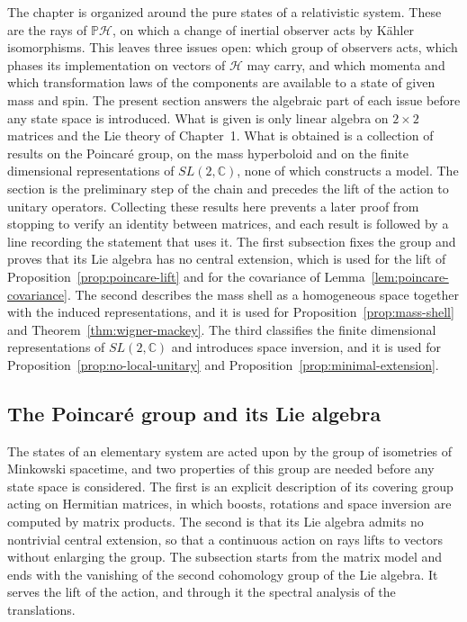The chapter is organized around the pure states of a relativistic system. These are the rays of $\mathbb{P}\mathcal{H}$, on which a change of inertial observer acts by Kähler isomorphisms. This leaves three issues open: which group of observers acts, which phases its implementation on vectors of $\mathcal{H}$ may carry, and which momenta and which transformation laws of the components are available to a state of given mass and spin. The present section answers the algebraic part of each issue before any state space is introduced. What is given is only linear algebra on $2\times2$ matrices and the Lie theory of Chapter~1. What is obtained is a collection of results on the Poincar\'e group, on the mass hyperboloid and on the finite dimensional representations of $SL(2,\mathbb{C})$, none of which constructs a model. The section is the preliminary step of the chain and precedes the lift of the action to unitary operators. Collecting these results here prevents a later proof from stopping to verify an identity between matrices, and each result is followed by a line recording the statement that uses it. The first subsection fixes the group and proves that its Lie algebra has no central extension, which is used for the lift of Proposition~\ref{prop:poincare-lift} and for the covariance of Lemma~\ref{lem:poincare-covariance}. The second describes the mass shell as a homogeneous space together with the induced representations, and it is used for Proposition~\ref{prop:mass-shell} and Theorem~\ref{thm:wigner-mackey}. The third classifies the finite dimensional representations of $SL(2,\mathbb{C})$ and introduces space inversion, and it is used for Proposition~\ref{prop:no-local-unitary} and Proposition~\ref{prop:minimal-extension}.

\subsection{The Poincar\'e group and its Lie algebra}
\label{sec:poincare-group}

The states of an elementary system are acted upon by the group of isometries of Minkowski spacetime, and two properties of this group are needed before any state space is considered. The first is an explicit description of its covering group acting on Hermitian matrices, in which boosts, rotations and space inversion are computed by matrix products. The second is that its Lie algebra admits no nontrivial central extension, so that a continuous action on rays lifts to vectors without enlarging the group. The subsection starts from the matrix model and ends with the vanishing of the second cohomology group of the Lie algebra. It serves the lift of the action, and through it the spectral analysis of the translations.

